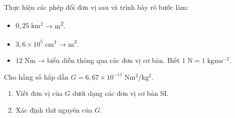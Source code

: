 \begin{ex}
	Thực hiện các phép đổi đơn vị sau và trình bày rõ bước làm:
	\begin{itemize}
		\item \(0{,}25\;\si{\kilo\meter^{2}}\) → \si{\meter^{2}}.
		\item \(3{,}6\times10^{5}\;\si{\centi\meter^{3}}\) → \si{\meter^{3}}.
		\item \(12\;\si{\newton\meter}\) → biểu diễn thông qua các đơn vị cơ bản. Biết \(1\;\si{\newton} = 1\;\si{\kilogram\meter\second^{-2}}\).
	\end{itemize}
\end{ex}

\begin{ex}
	Cho hằng số hấp dẫn \(G = 6{,}67\times10^{-11}\;\si{\newton\meter^{2}\per\kilogram^{2}}\).
	\begin{enumerate}[label=\alph*)]
		\item Viết đơn vị của \(G\) dưới dạng các đơn vị cơ bản SI.
		\item Xác định thứ nguyên của \(G\).
	\end{enumerate}
\end{ex}

